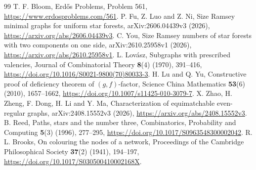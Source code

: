 \documentclass[11pt,a4paper]{article}
\theoremstyle{definition}
\begin{document}
\begin{thebibliography}{99}
 T. F. Bloom, Erdős Problems, Problem 561, \url{https://www.erdosproblems.com/561}.
 P. Fu, Z. Luo and Z. Ni, Size Ramsey minimal graphs for uniform star forests, arXiv:2606.04439v3 (2026), \url{https://arxiv.org/abs/2606.04439v3}.
 C. You, Size Ramsey numbers of star forests with two components on one side, arXiv:2610.25958v1 (2026), \url{https://arxiv.org/abs/2610.25958v1}.
 L. Lovász, Subgraphs with prescribed valencies, Journal of Combinatorial Theory \textbf{8}(4) (1970), 391--416, \url{https://doi.org/10.1016/S0021-9800(70)80033-3}.
 H. Lu and Q. Yu, Constructive proof of deficiency theorem of $(g,f)$-factor, Science China Mathematics \textbf{53}(6) (2010), 1657--1662, \url{https://doi.org/10.1007/s11425-010-3079-7}.
 X. Zhao, H. Zheng, F. Dong, H. Li and Y. Ma, Characterization of equimatchable even-regular graphs, arXiv:2408.15552v3 (2026), \url{https://arxiv.org/abs/2408.15552v3}.
 B. Reed, Paths, stars and the number three, Combinatorics, Probability and Computing \textbf{5}(3) (1996), 277--295, \url{https://doi.org/10.1017/S0963548300002042}.
 R. L. Brooks, On colouring the nodes of a network, Proceedings of the Cambridge Philosophical Society \textbf{37}(2) (1941), 194--197, \url{https://doi.org/10.1017/S030500410002168X}.
\end{thebibliography}
\end{document}
